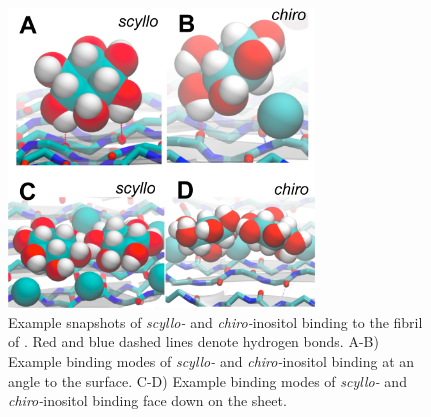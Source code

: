 \begin{figure}[htbp]
  \centering
  \includegraphics[width=3.2in]{figures/results1/GA4_paper_figures_submitted-7}
  \caption[Example snapshots of \textit{scyllo-} and \textit{chiro-}inositol binding to the fibril of \gafour.]{Example snapshots of \textit{scyllo-} and \textit{chiro-}inositol binding to the fibril of \gafour. Red and blue dashed lines denote hydrogen bonds. A-B) Example binding modes of \textit{scyllo-} and \textit{chiro-}inositol binding at an angle to the surface. C-D) Example binding modes of \textit{scyllo-} and \textit{chiro-}inositol binding face down on the sheet.}
   \label{fig:figure7}
\end{figure}

